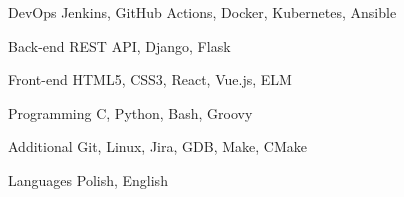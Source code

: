 
\begin{cvskills}

  \cvskill
    {DevOps} %
    {Jenkins, GitHub Actions, Docker, Kubernetes, Ansible} %

  \cvskill
    {Back-end} %
    {REST API, Django, Flask} %

  \cvskill
    {Front-end} %
    {HTML5, CSS3, React, Vue.js, ELM} %

  \cvskill
    {Programming} %
    {C, Python, Bash, Groovy} %

  \cvskill
    {Additional} %
    {Git, Linux, Jira, GDB, Make, CMake} %

  \cvskill
    {Languages} %
    {Polish, English} %

\end{cvskills}

